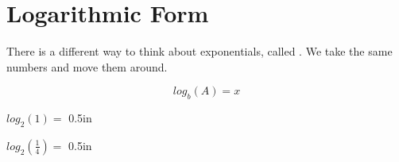 \section{Logarithmic Form}

There is a different way to think about exponentials, called 
 .
We take the same numbers and move them around.
\begin{tcolorbox}[center,colback=white,width=3in]
    \Large
    \[ log_b(A) = x \]
\end{tcolorbox}

{
    $log_2(1) = $  
}
{0.5in}


\myProblem
{
    $log_2(\frac{1}{4}) = $  
}
{0.5in}

